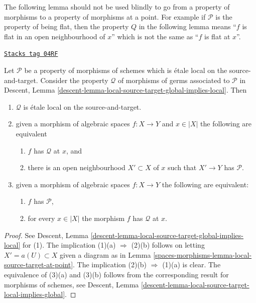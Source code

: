 The following lemma should not be used blindly to go from a property of
morphisms to a property of morphisms at a point. For example if
$\mathcal{P}$ is the property of being flat, then the property
$Q$ in the following lemma means ``$f$ is flat in an open neighbourhood
of $x$'' which is not the same as ``$f$ is flat at $x$''.

\begin{lemma}
\label{spaces-morphisms-lemma-local-source-target-global-implies-local}
\href{https://stacks.math.columbia.edu/tag/04RF}{\texttt{Stacks tag 04RF}}

Let $\mathcal{P}$ be a property of morphisms of schemes
which is \'etale local on the source-and-target.
Consider the property $\mathcal{Q}$ of morphisms
of germs associated to $\mathcal{P}$ in
Descent, Lemma \ref{descent-lemma-local-source-target-global-implies-local}.
Then
\begin{enumerate}
\item $\mathcal{Q}$ is \'etale local on the source-and-target.
\item given a morphism of algebraic spaces $f : X \to Y$ and $x \in |X|$
the following are equivalent
\begin{enumerate}
\item $f$ has $\mathcal{Q}$ at $x$, and
\item there is an open neighbourhood $X' \subset X$ of $x$
such that $X' \to Y$ has $\mathcal{P}$.
\end{enumerate}
\item given a morphism of algebraic spaces $f : X \to Y$
the following are equivalent:
\begin{enumerate}
\item $f$ has $\mathcal{P}$,
\item for every $x \in |X|$ the morphism $f$ has $\mathcal{Q}$ at $x$.
\end{enumerate}
\end{enumerate}
\end{lemma}

\begin{proof}
See
Descent, Lemma \ref{descent-lemma-local-source-target-global-implies-local}
for (1). The implication (1)(a) $\Rightarrow$ (2)(b) follows on letting
$X' = a(U) \subset X$ given a diagram as in
Lemma \ref{spaces-morphisms-lemma-local-source-target-at-point}.
The implication (2)(b) $\Rightarrow$ (1)(a) is clear.
The equivalence of (3)(a) and (3)(b) follows from the corresponding
result for morphisms of schemes, see
Descent, Lemma \ref{descent-lemma-local-source-target-local-implies-global}.
\end{proof}

